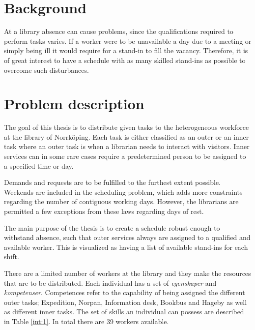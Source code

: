 

\section{Background}
At a library absence can cause problems, since the qualifications required to perform tasks varies. If a worker were to be unavailable a day due to a meeting or simply being ill it would require for a stand-in to fill the vacancy. Therefore, it is of great interest to have a schedule with as many skilled stand-ins as possible to overcome such disturbances. 


\section{Problem description}
The goal of this thesis is to distribute given tasks to the heterogeneous workforce at the library of Norrköping. Each task is either classified as an outer or an inner task where an outer task is when a librarian needs to interact with visitors. Inner services can in some rare cases require a predetermined person to be assigned to a specified time or day.

Demands and requests are to be fulfilled to the furthest extent possible. Weekends are included in the scheduling problem, which adds more constraints regarding the number of contiguous working days. However, the librarians are permitted a few exceptions from these laws regarding days of rest.

The main purpose of the thesis is to create a schedule robust enough to withstand absence, such that outer services always are assigned to a qualified and available worker. This is visualized as having a list of available stand-ins for each shift. 

There are a limited number of workers at the library and they make the resources that are to be distributed. Each individual has a set of \textit{egenskaper} and \textit{kompetenser}. Competences refer to the capability of being assigned the different outer tasks; Expedition, Norpan, Information desk, Bookbus and Hageby as well as different inner tasks. The set of skills an individual can possess are described in Table \ref{int:1}. In total there are 39 workers available. 


